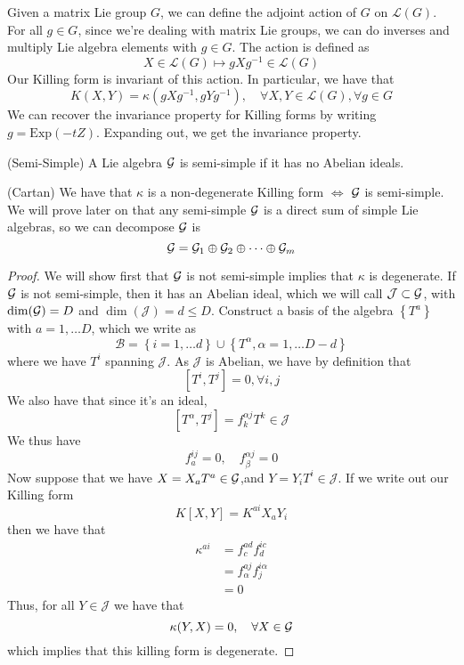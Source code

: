Given a matrix Lie group $G$, we can define the 
adjoint action of $ G $ on $ \mathcal{ L } ( G ) $. 
For all $ g \in G $, since we're dealing with matrix Lie 
groups, we can do inverses and multiply Lie algebra elements with 
$ g  \in G $. The action is defined as 
\[
	X \in \mathcal{ L } ( G ) \mapsto g X g^{ - 1 } \in \mathcal{ L }  (G ) 
\] Our Killing form is 
invariant of this action. In particular, we have that 
\[
	K ( X, Y ) = \kappa ( g X g^{ - 1} , g Y g^{ - 1 } ) ,\quad
	\forall X, Y \in \mathcal{ L } ( G ) , \forall g \in G 
\] We can recover the invariance property
for Killing forms by writing 
$ g = \text{Exp}( - t Z ) $. Expanding out, we get 
the invariance property. 


\begin{defn}{(Semi-Simple)} 
	A Lie algebra $ \mathcal{ G } $ is semi-simple if it has no Abelian ideals. 
\end{defn}

\begin{thm}{(Cartan)}
	We have that $ \kappa $ is a non-degenerate Killing form $ \iff $ $ \mathcal{ G } $ 
	is semi-simple. 
	We will prove later on that any semi-simple $ \mathcal{ G } $ is a direct sum of 
simple Lie algebras, 
so we can decompose $\mathcal{ G }$ is 
\[
\mathcal{ G } = \mathcal{ G }_ 1 \oplus \mathcal{ G }_ 2 \oplus \dots \oplus \mathcal{ G }_{ m }\]
\begin{proof}
	We will show first that $ \mathcal{ G } $ is not semi-simple implies that
	$ \kappa $ is degenerate. 
	If $ \mathcal{ G } $ is not semi-simple, then it has an Abelian ideal, 
	which we will call $ \mathcal{ J } \subset \mathcal{ G }$, with 
	$\dim ( \mathcal{ G } ) = D $ and $ \dim ( \mathcal{ J } )  = d \leq D $. 
	Construct a basis of the algebra $ \left\{  T^ a  \right\} $ with 
	$ a  = 1 , \dots D $, which we write as 
	\[
	 \mathcal{ B } = \left\{  i = 1 , \dots d  \right\}  \cup \left\{ 
	 T ^{\alpha } , \alpha = 1, \dots D - d\right\} 
	\] where we have $ T ^ i $ spanning $\mathcal{ J  } $. 
	As $ \mathcal{ J } $ is Abelian, we have by definition 
	that 
	\[
	 [ T ^ i , T ^ j ] = 0 , \forall i,j 
	\] We also have that since it's an ideal, 
	\[
	 [ T ^ \alpha , T ^ j ] = f ^{ \alpha j } _ k T ^ k \in \mathcal{ J }
	\] We thus have 
	\[
	 f^{ ij } _ a = 0 , \quad f^{ \alpha j } _ \beta = 0 
	\] Now suppose that we have 
	$ X = X_ a T ^ a \in \mathcal{ G }  $,and $ Y = Y _ i T ^ i \in \mathcal{ J } $. 
	If we write out our Killing form 
	\[
	 K [ X, Y ] = K^{ ai } X_ a Y_ i
	\] then we have that 
	\begin{align*}
		\kappa ^{ ai } & = f ^{ ad }_ c f ^{ ic } _ d \\
		&=  f ^{ aj } _ \alpha f ^{ i \alpha } _ j  \\ 
		&= 0  
	\end{align*} 
	Thus, for all $ Y \in \mathcal{ J } $ we have that 
	\[
	 \kappa ( Y , X ) = 0 , \quad \forall X \in \mathcal{ G } 
	\] which implies that this killing form is degenerate. 
\end{proof}
\end{thm}


